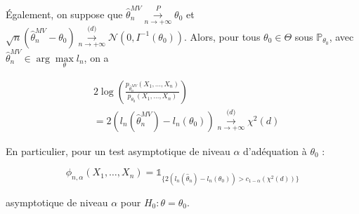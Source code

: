 \documentclass[12pt]{article}
\newcommand{\petitespace}{\vspace{0.5cm}}
\newcommand{\bb}[1]{\mathbb{#1}} %
\renewcommand{\P}{\bb{P}}%
\newcommand{\Max}[1]{\max\limits_{#1}}
\newcommand{\chideux}[1]{\chi^2(#1)} %
\newcommand{\normale}[2]{\mathcal{N}(#1,#2)} %
\newcommand{\Xunan}{X_1,\ldots,X_n} %
\newcommand{\EMV}{\widehat{\theta}_n^{MV}}
\newcommand{\1}{\bb{1}} %
\newcommand{\cvn}{\underset{n\rightarrow+\infty}{\longrightarrow}} %
\newcommand{\cvP}{\overset{P}{\cvn}} %
\newcommand{\cvl}{\overset{\mathcal (d)}{\cvn}} %
\begin{document}
Également, on suppose que  $\EMV \cvP \theta_0$ et $\sqrt n(\EMV-\theta_0) \cvl \normale{0}{I^{-1}(\theta_0)}$. Alors, pour tous $\theta_0 \in \Theta$ sous $\P_{\theta_0}$, avec $\EMV \in \arg \Max{\theta} l_n$, on a

\begin{align*}
	 &2\log(\frac{p_{\EMV}(\Xunan)}{p_{\theta_0}(\Xunan)}) \\
	 &= 2(l_n(\EMV)-l_n(\theta_0) )\cvl \chideux{d}
\end{align*}
\petitespace

En particulier, pour un test asymptotique de niveau $\alpha$ d'adéquation à $\theta_0$ : 

$$\phi_{n,\alpha}(\Xunan) = \1_{\big\{ 2(l_n(\widehat \theta_n)-l_n(\theta_0) )> c_{1-\alpha}(\chideux{d} )\big\}} $$

asymptotique de niveau $\alpha$ pour $H_0 : \theta = \theta_0$.

\petitespace
\end{document}
